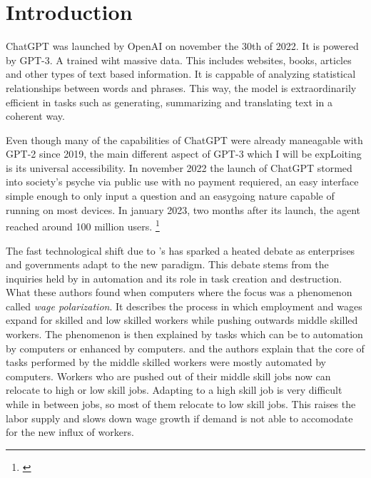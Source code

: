 \section{Introduction}

ChatGPT was launched by OpenAI on november the 30th of 2022. It is powered by GPT-3. A  trained wiht massive data. This includes websites, books, articles and other types of text based information. It is cappable of analyzing statistical relationships between words and phrases. This way, the model is extraordinarily efficient in tasks such as generating, summarizing and translating text in a coherent way. \citep{RAY2023121}

Even though many of the capabilities of ChatGPT were already maneagable with GPT-2 since 2019, the main different aspect of GPT-3 which I will be expLoiting is its universal accessibility. In november 2022 the launch of ChatGPT stormed into society's psyche via public use with no payment requiered, an easy interface simple enough to only input a question and an easygoing nature capable of running on most devices. In january 2023, two months after its launch, the agent reached around 100 million users. \footnote{\cite{paris2023chatgpt}}

The fast technological shift due to 's has sparked a heated debate as enterprises and governments adapt to the new paradigm. This debate stems from the inquiries held by \cite{krueger,autor2003,goldin2007,katz1999,acemoglu2018} in automation and its role in task creation and destruction. What these authors found when computers where the focus was a phenomenon called \textit{wage polarization}. It describes the process in which employment and wages expand for skilled and low skilled workers while pushing outwards middle skilled workers. The phenomenon is then explained by tasks which can be to automation by computers or enhanced by computers. and the authors explain that the core of tasks performed by the middle skilled workers were mostly automated by computers. Workers who are pushed out of their middle skill jobs now can relocate to high or low skill jobs. Adapting to a high skill job is very difficult while in between jobs, so most of them relocate to low skill jobs. This raises the labor supply and slows down wage growth if demand is not able to accomodate for the new influx of workers.

